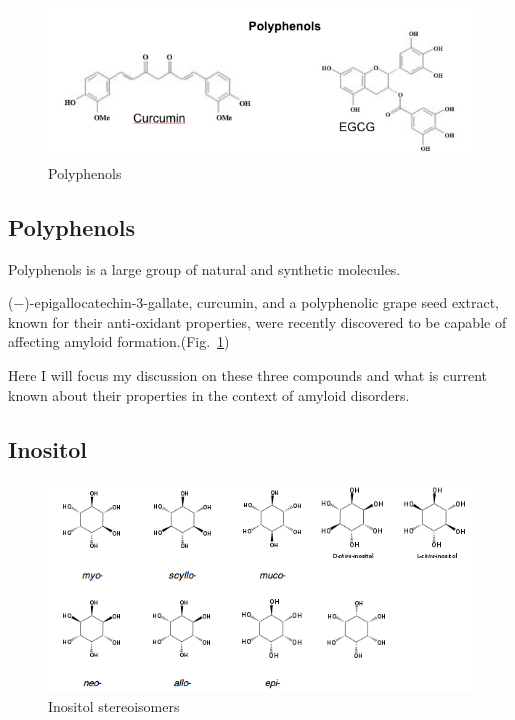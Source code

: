 
\begin{figure}
\centering
\includegraphics[width=6in]{figures/introduction/polyphenols.png}
\caption[Small molecule binders]{Polyphenols}
\label{fig:polyphenols}
\end{figure}

\subsection{Polyphenols}
Polyphenols is a large group of natural and synthetic molecules.  

(−)-epigallocatechin-3-gallate, curcumin, and a polyphenolic grape seed extract, known for their anti-oxidant properties,  were recently discovered to be capable of affecting amyloid formation.(Fig.~\ref{fig:polyphenols}) 

Here I will focus my discussion on these three compounds and what is current known about their properties in the context of amyloid disorders.


\subsection{Inositol}
\begin{figure}
\centering
\includegraphics[width=6in]{figures/introduction/inositol.png}
\caption[Inositol]{Inositol stereoisomers}
\label{fig:inositols}
\end{figure}

